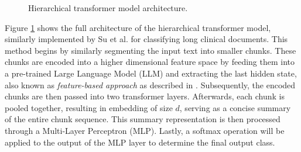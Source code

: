 \begin{figure}[htbp]
    \caption{Hierarchical transformer model architecture.}
    \label{fig:hi_model}
\end{figure}


Figure \ref{fig:hi_model} shows the full architecture of the hierarchical transformer model, similarly implemented by Su et al. \cite{su-2021-classifying} for classifying long clinical documents. This method begins by similarly segmenting the input text into smaller chunks. These chunks are encoded into a higher dimensional feature space by feeding them into a pre-trained Large Language Model (LLM) and extracting the last hidden state, also known as \textit{feature-based approach} as described in \cite{sun-2020-fine-tune}. Subsequently, the encoded chunks are then passed into two transformer layers. Afterwards, each chunk is pooled together, resulting in embedding of size \(d\), serving as a concise summary of the entire chunk sequence. This summary representation is then processed through a Multi-Layer Perceptron (MLP). Lastly, a softmax operation will be applied to the output of the MLP layer to determine the final output class.

